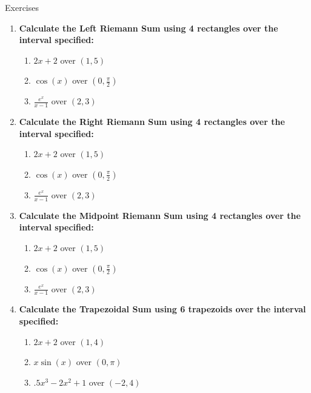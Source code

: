 \documentclass[../revisedmain.tex]{subfiles}
\begin{document}
\begin{center}
\LARGE Exercises
\end{center}
\begin{enumerate}
	\item \textbf{Calculate the Left Riemann Sum using 4 rectangles over the interval specified:}
	\begin{enumerate}
		\item $2x+2$ over $(1,5)$
		\item $\cos(x)$ over $(0,\frac{\pi}{2})$
		\item $\frac{e^x}{x-1}$ over $(2,3)$
	\end{enumerate}
	\item \textbf{Calculate the Right Riemann Sum using 4 rectangles over the interval specified:}
	\begin{enumerate}
		\item $2x+2$ over $(1,5)$
		\item $\cos(x)$ over $(0,\frac{\pi}{2})$
		\item $\frac{e^x}{x-1}$ over $(2,3)$
	\end{enumerate}
	\item \textbf{Calculate the Midpoint Riemann Sum using 4 rectangles over the interval specified:}
	\begin{enumerate}
		\item $2x+2$ over $(1,5)$
		\item $\cos(x)$ over $(0,\frac{\pi}{2})$
		\item $\frac{e^x}{x-1}$ over $(2,3)$
	\end{enumerate}
	\item \textbf{Calculate the Trapezoidal Sum using 6 trapezoids over the interval specified:}
	\begin{enumerate}
		\item $2x+2$ over $(1,4)$
		\item $x\sin(x)$ over $(0,\pi)$
		\item $.5x^3-2x^2+1$ over $(-2,4)$
	\end{enumerate}
\end{enumerate}
\end{document}
